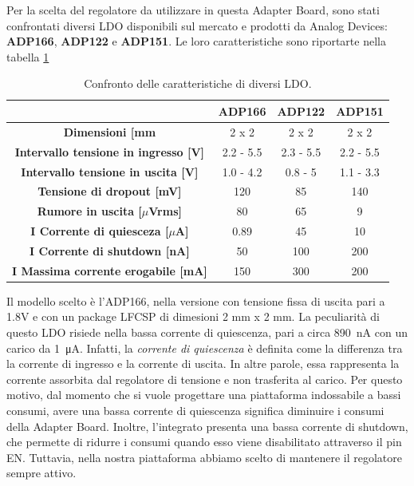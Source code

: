 Per la scelta del regolatore da utilizzare in questa Adapter Board, sono stati confrontati diversi LDO disponibili sul mercato e prodotti da Analog Devices: \textbf{ADP166}\cite{AnalogDevicesADP166}, \textbf{ADP122}\cite{AnalogDevicesADP122} e \textbf{ADP151}\cite{AnalogDevicesADP151}. Le loro caratteristiche sono riportarte nella tabella \ref{tab:ConfrontoLDO}
\begin{table}[h]
	\renewcommand{\arraystretch}{1.5}
	\begin{tabular}{cccc}
		\hline
		& \textbf{ADP166} & \textbf{ADP122} & \textbf{ADP151} \\ \hline
		\textbf{Dimensioni {[}mm\ap{2}{]}}                   & 2 x 2           & 2 x 2           & 2 x 2           \\ \hline
		\textbf{Intervallo tensione in ingresso {[}V{]}}  & 2.2 - 5.5       & 2.3 - 5.5       & 2.2 - 5.5       \\ \hline
		\textbf{Intervallo tensione in uscita {[}V{]}}    & 1.0 - 4.2       & 0.8 - 5         & 1.1 - 3.3       \\ \hline
		\textbf{Tensione di dropout {[}mV{]}}            & 120             & 85              & 140             \\ \hline
		\textbf{Rumore in uscita {[}$\mu$Vrms{]}}         & 80              & 65              & 9               \\ \hline
		\textbf{I\ped{q} Corrente di quiesceza {[}$\mu$A{]}}    & 0.89            & 45              & 10              \\ \hline
		\textbf{I\ped{s} Corrente di shutdown {[}nA{]}}      & 50              & 100             & 200             \\ \hline
		\textbf{I\ped{MAX} Massima corrente erogabile {[}mA{]}} & 150             & 300             & 200             \\ \hline
	\end{tabular}
	\caption{Confronto delle caratteristiche di diversi LDO.}
	\label{tab:ConfrontoLDO}
\end{table}

\noindent Il modello scelto è l'ADP166, nella versione con tensione fissa di uscita pari a 1.8V e con un package LFCSP di dimesioni 2 mm x 2 mm. La peculiarità di questo LDO risiede nella bassa corrente di quiescenza, pari a circa \SI{890}{\nano\ampere} con un carico da \SI{1}{\micro\ampere}\cite{AnalogDevicesADP166}. Infatti, la \textit{corrente di quiescenza} è definita come la differenza tra la corrente di ingresso e la corrente di uscita\cite{Lee1999}. In altre parole, essa rappresenta la corrente assorbita dal regolatore di tensione e non trasferita al carico. Per questo motivo, dal momento che si vuole progettare una piattaforma indossabile a bassi consumi, avere una bassa corrente di quiescenza significa diminuire i consumi della Adapter Board. Inoltre, l'integrato presenta una bassa corrente di shutdown, che permette di ridurre i consumi quando esso viene disabilitato attraverso il pin EN. Tuttavia, nella nostra piattaforma abbiamo scelto di mantenere il regolatore sempre attivo.

